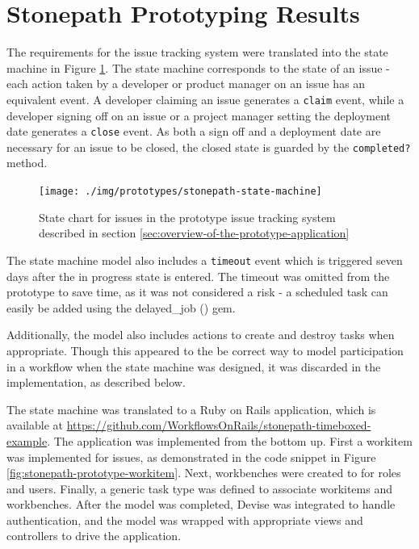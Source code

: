 \documentclass[document.tex]{subfiles}
\begin{document}
\section {Stonepath Prototyping Results}
\label {sec:stonepath-prototyping-results}

The requirements for the issue tracking system were translated into the state machine in Figure \ref{fig:stonepath-prototype-state-machine}. The state machine corresponds to the state of an issue - each action taken by a developer or product manager on an issue has an equivalent event. A developer claiming an issue generates a \verb!claim! event, while a developer signing off on an issue or a project manager setting the deployment date generates a \verb!close! event. As both a sign off and a deployment date are necessary for an issue to be closed, the closed state is guarded by the \verb!completed?! method.

\begin{figure}[!ht]
\centering \texttt{[image: ./img/prototypes/stonepath-state-machine]}
\caption{State chart for issues in the prototype issue tracking system described in section \ref{sec:overview-of-the-prototype-application}}
\label{fig:stonepath-prototype-state-machine}
\end{figure}

The state machine model also includes a \verb!timeout! event which is triggered seven days after the in progress state is entered. The timeout was omitted from the prototype to save time, as it was not considered a risk - a scheduled task can easily be added using the delayed\_job () gem.

Additionally, the model also includes actions to create and destroy tasks when appropriate. Though this appeared to the be correct way to model participation in a workflow when the state machine was designed, it was discarded in the implementation, as described below.

The state machine was translated to a Ruby on Rails application, which is available at \url{https://github.com/WorkflowsOnRails/stonepath-timeboxed-example}. The application was implemented from the bottom up. First a workitem was implemented for issues, as demonstrated in the code snippet in Figure \ref{fig:stonepath-prototype-workitem}. Next, workbenches were created to for roles and users. Finally, a generic task type was defined to associate workitems and workbenches. After the model was completed, Devise was integrated to handle authentication, and the model was wrapped with appropriate views and controllers to drive the application.
\end{document}
